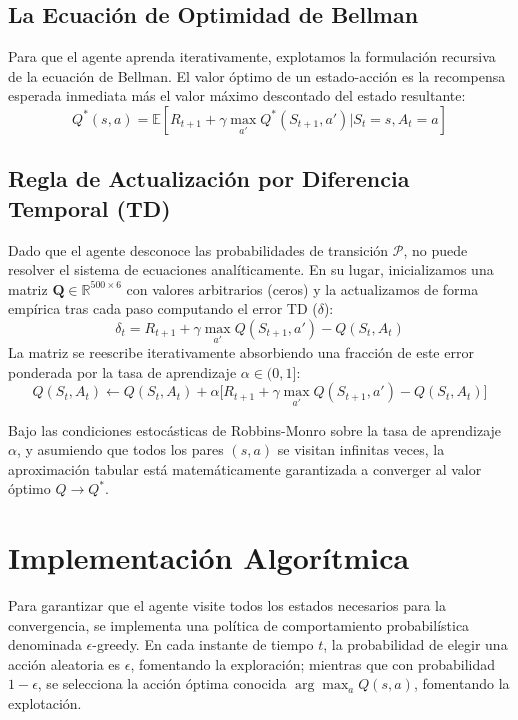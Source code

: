 \documentclass[12pt,a4paper]{article}
\begin{document}
\subsection{La Ecuación de Optimidad de Bellman}
Para que el agente aprenda iterativamente, explotamos la formulación recursiva de la ecuación de Bellman. El valor óptimo de un estado-acción es la recompensa esperada inmediata más el valor máximo descontado del estado resultante:
\begin{equation}
    Q^*(s,a) = \mathbb{E} \left[ R_{t+1} + \gamma \max_{a'} Q^*(S_{t+1}, a') \bigg| S_t=s, A_t=a \right]
\end{equation}

\subsection{Regla de Actualización por Diferencia Temporal (TD)}
Dado que el agente desconoce las probabilidades de transición $\mathcal{P}$, no puede resolver el sistema de ecuaciones analíticamente. En su lugar, inicializamos una matriz $\mathbf{Q} \in \mathbb{R}^{500 \times 6}$ con valores arbitrarios (ceros) y la actualizamos de forma empírica tras cada paso computando el error TD ($\delta$):
\begin{equation}
    \delta_t = R_{t+1} + \gamma \max_{a'} Q(S_{t+1}, a') - Q(S_t, A_t)
\end{equation}
La matriz se reescribe iterativamente absorbiendo una fracción de este error ponderada por la tasa de aprendizaje $\alpha \in (0, 1]$:
\begin{equation} \label{eq:qlearning}
    Q(S_t, A_t) \leftarrow Q(S_t, A_t) + \alpha \Big[ R_{t+1} + \gamma \max_{a'} Q(S_{t+1}, a') - Q(S_t, A_t) \Big]
\end{equation}

Bajo las condiciones estocásticas de Robbins-Monro sobre la tasa de aprendizaje $\alpha$, y asumiendo que todos los pares $(s, a)$ se visitan infinitas veces, la aproximación tabular está matemáticamente garantizada a converger al valor óptimo $Q \to Q^*$.

\section{Implementación Algorítmica}

Para garantizar que el agente visite todos los estados necesarios para la convergencia, se implementa una política de comportamiento probabilística denominada $\epsilon$-greedy. En cada instante de tiempo $t$, la probabilidad de elegir una acción aleatoria es $\epsilon$, fomentando la exploración; mientras que con probabilidad $1 - \epsilon$, se selecciona la acción óptima conocida $\arg\max_a Q(s, a)$, fomentando la explotación.
\end{document}
